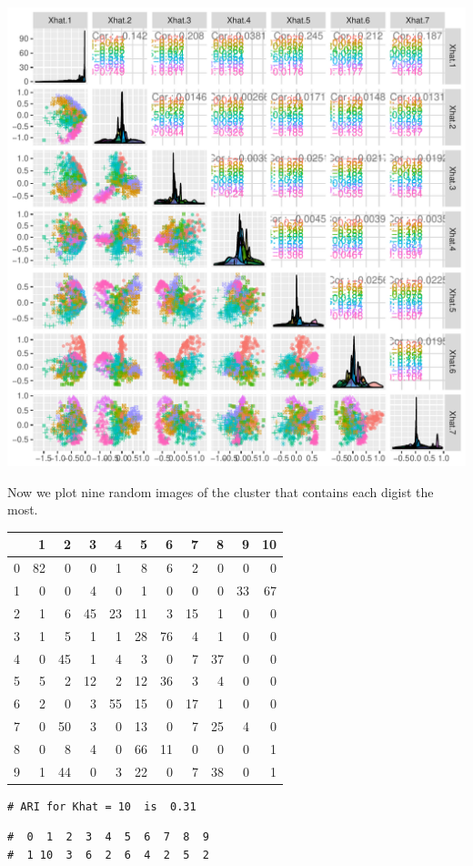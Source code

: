 \documentclass[]{article}
\begin{document}
\includegraphics{gmmase_files/figure-latex/cor-1.pdf}

Now we plot nine random images of the cluster that contains each digist
the most.

\begin{longtable}[]{@{}lrrrrrrrrrr@{}}
\toprule
& 1 & 2 & 3 & 4 & 5 & 6 & 7 & 8 & 9 & 10\tabularnewline
\midrule
\endhead
0 & 82 & 0 & 0 & 1 & 8 & 6 & 2 & 0 & 0 & 0\tabularnewline
1 & 0 & 0 & 4 & 0 & 1 & 0 & 0 & 0 & 33 & 67\tabularnewline
2 & 1 & 6 & 45 & 23 & 11 & 3 & 15 & 1 & 0 & 0\tabularnewline
3 & 1 & 5 & 1 & 1 & 28 & 76 & 4 & 1 & 0 & 0\tabularnewline
4 & 0 & 45 & 1 & 4 & 3 & 0 & 7 & 37 & 0 & 0\tabularnewline
5 & 5 & 2 & 12 & 2 & 12 & 36 & 3 & 4 & 0 & 0\tabularnewline
6 & 2 & 0 & 3 & 55 & 15 & 0 & 17 & 1 & 0 & 0\tabularnewline
7 & 0 & 50 & 3 & 0 & 13 & 0 & 7 & 25 & 4 & 0\tabularnewline
8 & 0 & 8 & 4 & 0 & 66 & 11 & 0 & 0 & 0 & 1\tabularnewline
9 & 1 & 44 & 0 & 3 & 22 & 0 & 7 & 38 & 0 & 1\tabularnewline
\bottomrule
\end{longtable}

\begin{verbatim}
# ARI for Khat = 10  is  0.31
\end{verbatim}

\begin{verbatim}
#  0  1  2  3  4  5  6  7  8  9 
#  1 10  3  6  2  6  4  2  5  2
\end{verbatim}
\end{document}
